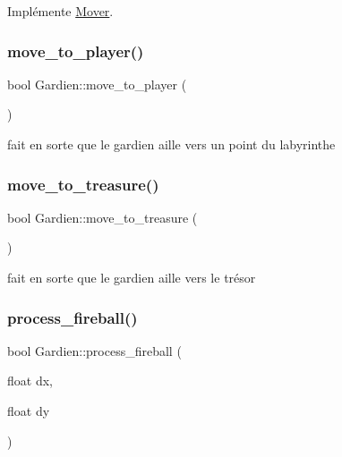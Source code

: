 Implémente \hyperlink{classMover_a2e1858e5c93ddaa85ff7b446ad403b79}{Mover}.

\mbox{\label{classGardien_accc4aeb42df9851b31bea75b9a06807b}} 
\subsubsection{\texorpdfstring{move\+\_\+to\+\_\+player()}{move\_to\_player()}}
{\footnotesize\ttfamily bool Gardien\+::move\+\_\+to\+\_\+player (\begin{DoxyParamCaption}{ }\end{DoxyParamCaption})\hspace{0.3cm}{\ttfamily [private]}}



fait en sorte que le gardien aille vers un point du labyrinthe 

\mbox{\label{classGardien_a1661d21c1b1f3155fd626c1af22db4fc}} 
\subsubsection{\texorpdfstring{move\+\_\+to\+\_\+treasure()}{move\_to\_treasure()}}
{\footnotesize\ttfamily bool Gardien\+::move\+\_\+to\+\_\+treasure (\begin{DoxyParamCaption}{ }\end{DoxyParamCaption})\hspace{0.3cm}{\ttfamily [private]}}



fait en sorte que le gardien aille vers le trésor 

\mbox{\label{classGardien_ad1d0f6aca8be28477e16dae7a30301b8}} 
\subsubsection{\texorpdfstring{process\+\_\+fireball()}{process\_fireball()}}
{\footnotesize\ttfamily bool Gardien\+::process\+\_\+fireball (\begin{DoxyParamCaption}\item[{float}]{dx,  }\item[{float}]{dy }\end{DoxyParamCaption})\hspace{0.3cm}{\ttfamily [virtual]}}



